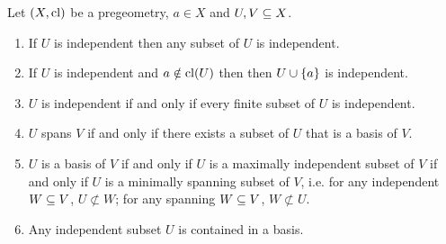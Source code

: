 \begin{prop}
    Let $(X,\operatorname{cl})$ be a pregeometry, $a \in X$ and $U,V \subseteq X$.
    \begin{enumerate}
        \item If $U$ is independent then any subset of $U$ is independent.
        \item If $U$ is independent and $a \notin \operatorname{cl}(U)$ then then 
            $U \cup \left\{a\right\}$ is independent.
        \item $U$ is independent if and only if every finite subset of $U$ is 
            independent.
        \item $U$ spans $V$ if and only if there exists a subset of 
            $U$ that is a basis of $V$. 
        \item $U$ is a basis of $V$ if and only if $U$ 
            is a maximally independent subset of $V$
            if and only if $U$ is a minimally spanning subset of $V$, 
            i.e. for any independent $W \subseteq V$, $U \not\subset W$;
            for any spanning $W \subseteq V$, $W \not\subset U$.
        \item Any independent subset $U$ is contained in a basis.
    \end{enumerate}
\end{prop}
